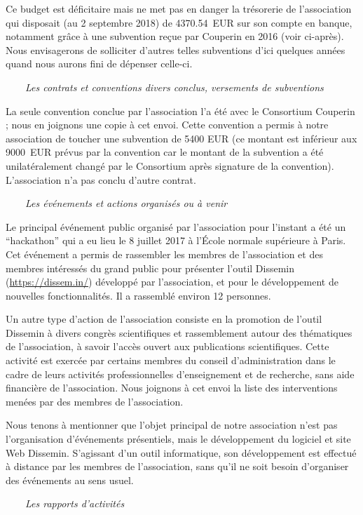 \documentclass[11pt]{lettre}
\begin{document}
\begin{letter}
Ce budget est déficitaire mais ne met pas en danger la trésorerie de l'association qui disposait (au 2 septembre 2018) de 4370.54~EUR sur son compte en banque, notamment grâce à une subvention reçue par Couperin en 2016 (voir ci-après). Nous envisagerons de solliciter d'autres telles subventions d'ici quelques années quand nous aurons fini de dépenser celle-ci.

    ~~~~\emph{Les contrats et conventions divers conclus, versements de
    subventions}

La seule convention conclue par l'association l'a été avec le Consortium
  Couperin ; nous en joignons une copie à cet envoi. Cette convention a permis à notre association de toucher une subvention de 5400 EUR (ce montant est inférieur aux 9000~EUR prévus par la convention car le montant de la subvention a été unilatéralement changé par le Consortium après signature de la convention). L'association n'a pas conclu d'autre contrat.

    ~~~~\emph{Les événements et actions organisés ou à venir}

Le principal événement public organisé par l'association pour l'instant a été un
  ``hackathon'' qui a eu lieu le 8 juillet 2017 à l'École normale supérieure à Paris. Cet événement a permis de rassembler les membres de l'association et des membres intéressés du grand public pour présenter l'outil Dissemin (\url{https://dissem.in/}) développé par l'association, et pour le développement de nouvelles fonctionnalités. Il a rassemblé environ 12 personnes.

Un autre type d'action de l'association consiste en la promotion de l'outil Dissemin à divers congrès scientifiques et rassemblement autour des thématiques de l'association, à savoir l'accès ouvert aux publications scientifiques. Cette activité est exercée par certains membres du conseil d'administration dans le cadre de leurs activités professionnelles d'enseignement et de recherche, sans aide financière de l'association. Nous joignons à cet envoi la liste des interventions menées par des membres de l'association.

Nous tenons à mentionner que l'objet principal de notre association n'est pas l'organisation d'événements présentiels, mais le développement du logiciel et site Web Dissemin. S'agissant d'un outil informatique, son développement est effectué à distance par les membres de l'association, sans qu'il ne soit besoin d'organiser des événements au sens usuel.

    ~~~~\emph{Les rapports d'activités}


\end{letter}
\end{document}
